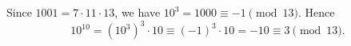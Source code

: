 Since $1001=7\cdot11\cdot13$, we have $10^3=1000\equiv-1\pmod{13}$. Hence
\[10^{10}=\left(10^3\right)^3\cdot10\equiv(-1)^3\cdot10=-10\equiv\boxed{3}\pmod{13}.\]
